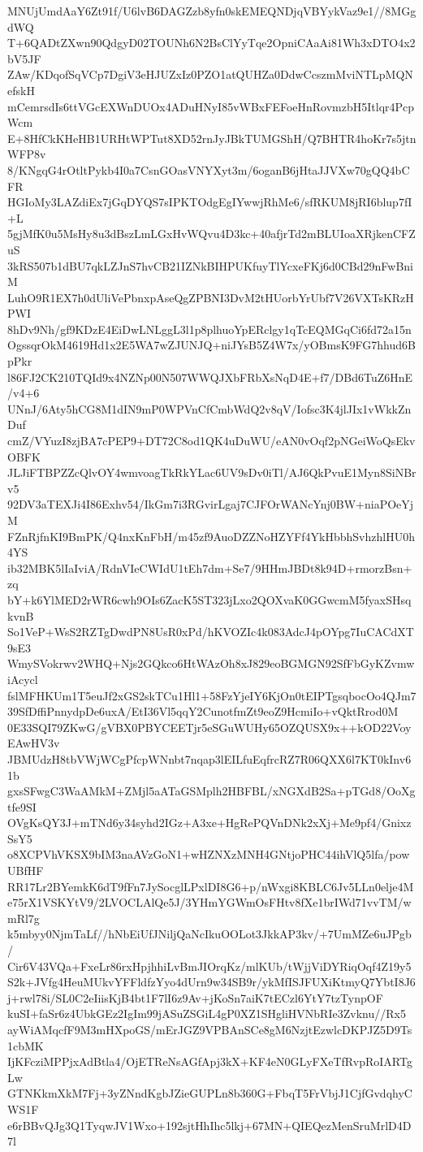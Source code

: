 MNUjUmdAaY6Zt91f/U6lvB6DAGZzb8yfn0skEMEQNDjqVBYykVaz9e1//8MGgdWQ
T+6QADtZXwn90QdgyD02TOUNh6N2BsClYyTqe2OpniCAaAi81Wh3xDTO4x2bV5JF
ZAw/KDqofSqVCp7DgiV3eHJUZxIz0PZO1atQUHZa0DdwCcszmMviNTLpMQNefskH
mCemrsdIs6ttVGcEXWnDUOx4ADuHNyI85vWBxFEFoeHnRovmzbH5Itlqr4PcpWcm
E+8HfCkKHeHB1URHtWPTut8XD52rnJyJBkTUMGShH/Q7BHTR4hoKr7s5jtnWFP8v
8/KNgqG4rOtltPykb4I0a7CsnGOasVNYXyt3m/6oganB6jHtaJJVXw70gQQ4bCFR
HGIoMy3LAZdiEx7jGqDYQS7sIPKTOdgEgIYwwjRhMe6/sfRKUM8jRI6blup7fI+L
5gjMfK0u5MsHy8u3dBszLmLGxHvWQvu4D3kc+40afjrTd2mBLUIoaXRjkenCFZuS
3kRS507b1dBU7qkLZJnS7hvCB21IZNkBIHPUKfuyTlYcxeFKj6d0CBd29nFwBniM
LuhO9R1EX7h0dUliVePbnxpAseQgZPBNI3DvM2tHUorbYrUbf7V26VXTsKRzHPWI
8hDv9Nh/gf9KDzE4EiDwLNLggL3l1p8plhuoYpERclgy1qTcEQMGqCi6fd72a15n
OgssqrOkM4619Hd1x2E5WA7wZJUNJQ+niJYsB5Z4W7x/yOBmsK9FG7hhud6BpPkr
l86FJ2CK210TQId9x4NZNp00N507WWQJXbFRbXsNqD4E+f7/DBd6TuZ6HnE/v4+6
UNnJ/6Aty5hCG8M1dIN9mP0WPVnCfCmbWdQ2v8qV/Iofsc3K4jlJIx1vWkkZnDuf
cmZ/VYuzI8zjBA7cPEP9+DT72C8od1QK4uDuWU/eAN0vOqf2pNGeiWoQsEkvOBFK
JLJiFTBPZZcQlvOY4wmvoagTkRkYLac6UV9sDv0iTl/AJ6QkPvuE1Myn8SiNBrv5
92DV3aTEXJi4I86Exhv54/IkGm7i3RGvirLgaj7CJFOrWANcYnj0BW+niaPOeYjM
FZnRjfnKI9BmPK/Q4nxKnFbH/m45zf9AuoDZZNoHZYFf4YkHbbhSvhzhlHU0h4YS
ib32MBK5lIaIviA/RdnVIeCWIdU1tEh7dm+Se7/9HHmJBDt8k94D+rmorzBsn+zq
bY+k6YlMED2rWR6cwh9OIs6ZacK5ST323jLxo2QOXvaK0GGwcmM5fyaxSHsqkvnB
So1VeP+WsS2RZTgDwdPN8UsR0xPd/hKVOZIc4k083AdcJ4pOYpg7IuCACdXT9sE3
WmySVokrwv2WHQ+Njs2GQkco6HtWAzOh8xJ829eoBGMGN92SfFbGyKZvmwiAcycl
fslMFHKUm1T5euJf2xGS2skTCu1Hl1+58FzYjeIY6KjOn0tEIPTgsqbocOo4QJm7
39SfDffiPnnydpDe6uxA/EtI36Vl5qqY2CunotfmZt9eoZ9HcmiIo+vQktRrod0M
0E33SQI79ZKwG/gVBX0PBYCEETjr5eSGuWUHy65OZQUSX9x++kOD22VoyEAwHV3v
JBMUdzH8tbVWjWCgPfcpWNnbt7nqap3lEILfuEqfrcRZ7R06QXX6l7KT0kInv61b
gxsSFwgC3WaAMkM+ZMjl5aATaGSMplh2HBFBL/xNGXdB2Sa+pTGd8/OoXgtfe9SI
OVgKsQY3J+mTNd6y34syhd2IGz+A3xe+HgRePQVnDNk2xXj+Me9pf4/GnixzSsY5
o8XCPVhVKSX9bIM3naAVzGoN1+wHZNXzMNH4GNtjoPHC44ihVlQ5lfa/powUBfHF
RR17Lr2BYemkK6dT9fFn7JySocglLPxlDI8G6+p/nWxgi8KBLC6Jv5LLn0elje4M
e75rX1VSKYtV9/2LVOCLAlQe5J/3YHmYGWmOsFHtv8fXe1brIWd71vvTM/wmRl7g
k5mbyy0NjmTaLf//hNbEiUfJNiljQaNcIkuOOLot3JkkAP3kv/+7UmMZe6uJPgb/
Cir6V43VQa+FxeLr86rxHpjhhiLvBmJIOrqKz/mlKUb/tWjjViDYRiqOqf4Z19y5
S2k+JVfg4HeuMUkvYFFldfzYyo4dUrn9w34SB9r/ykMfISJFUXiKtmyQ7YbtI8J6
j+rwl78i/SL0C2eIiisKjB4bt1F7lI6z9Av+jKoSn7aiK7tECzl6YtY7tzTynpOF
kuSI+faSr6z4UbkGEz2IgIm99jASuZSGiL4gP0XZ1SHgliHVNbRIe3Zvknu//Rx5
ayWiAMqcfF9M3mHXpoGS/mErJGZ9VPBAnSCe8gM6NzjtEzwlcDKPJZ5D9Ts1cbMK
IjKFcziMPPjxAdBtla4/OjETReNsAGfApj3kX+KF4eN0GLyFXeTfRvpRoIARTgLw
GTNKkmXkM7Fj+3yZNndKgbJZieGUPLn8b360G+FbqT5FrVbjJ1CjfGvdqhyCWS1F
e6rBBvQJg3Q1TyqwJV1Wxo+192sjtHhIhc5lkj+67MN+QIEQezMenSruMrlD4D7l
